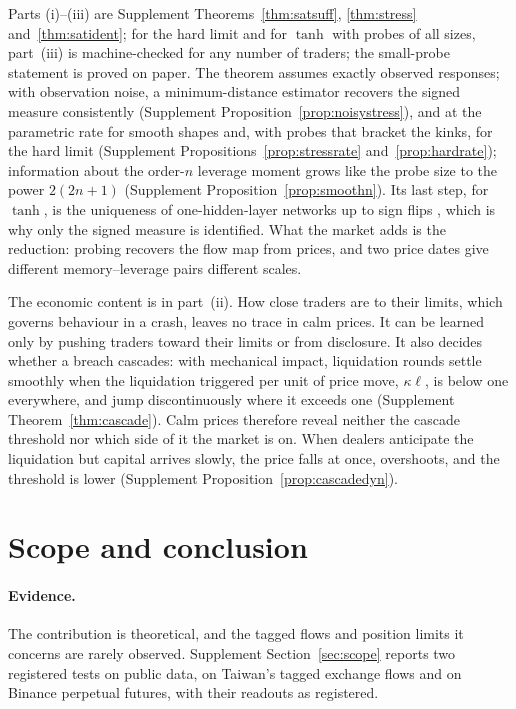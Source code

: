 \documentclass[12pt]{article}
\theoremstyle{definition}
\theoremstyle{remark}
\begin{document}
Parts (i)--(iii) are Supplement Theorems~\ref{thm:satsuff}, \ref{thm:stress} and~\ref{thm:satident}; for the hard limit and for $\tanh$ with probes of all sizes, part~(iii) is machine-checked for any number of traders; the small-probe statement is proved on paper. The theorem assumes exactly observed responses; with observation noise, a minimum-distance estimator recovers the signed measure consistently (Supplement Proposition~\ref{prop:noisystress}), and at the parametric rate for smooth shapes and, with probes that bracket the kinks, for the hard limit (Supplement Propositions~\ref{prop:stressrate} and~\ref{prop:hardrate}); information about the order-$n$ leverage moment grows like the probe size to the power $2(2n+1)$ (Supplement Proposition~\ref{prop:smoothn}). Its last step, for $\tanh$, is the uniqueness of one-hidden-layer networks up to sign flips \citep{sussmann1992}, which is why only the signed measure is identified. What the market adds is the reduction: probing recovers the flow map from prices, and two price dates give different memory--leverage pairs different scales.

The economic content is in part~(ii). How close traders are to their limits, which governs behaviour in a crash, leaves no trace in calm prices. It can be learned only by pushing traders toward their limits or from disclosure. It also decides whether a breach cascades: with mechanical impact, liquidation rounds settle smoothly when the liquidation triggered per unit of price move, $\kappa\ell$, is below one everywhere, and jump discontinuously where it exceeds one (Supplement Theorem~\ref{thm:cascade}). Calm prices therefore reveal neither the cascade threshold nor which side of it the market is on. When dealers anticipate the liquidation but capital arrives slowly, the price falls at once, overshoots, and the threshold is lower (Supplement Proposition~\ref{prop:cascadedyn}).

\section{Scope and conclusion}\label{n:concl}

\paragraph{Evidence.} The contribution is theoretical, and the tagged flows and position limits it concerns are rarely observed. Supplement Section~\ref{sec:scope} reports two registered tests on public data, on Taiwan's tagged exchange flows and on Binance perpetual futures, with their readouts as registered.
\end{document}
